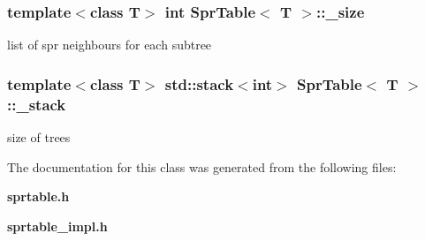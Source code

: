 \subsubsection{\setlength{\rightskip}{0pt plus 5cm}template$<$class T$>$ int {\bf Spr\-Table}$<$ T $>$::{\bf \_\-size}\hspace{0.3cm}{\tt  [protected]}}\label{classSprTable_p1}


list of spr neighbours for each subtree 

\subsubsection{\setlength{\rightskip}{0pt plus 5cm}template$<$class T$>$ std::stack$<$int$>$ {\bf Spr\-Table}$<$ T $>$::{\bf \_\-stack}\hspace{0.3cm}{\tt  [protected]}}\label{classSprTable_p2}


size of trees 



The documentation for this class was generated from the following files:\begin{CompactItemize}
\item 
{\bf sprtable.h}\item 
{\bf sprtable\_\-impl.h}\end{CompactItemize}
